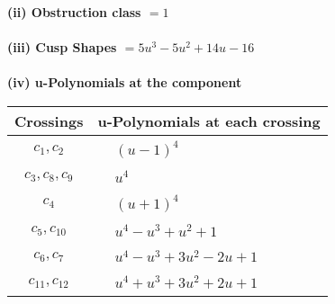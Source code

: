 \documentclass[1p]{elsarticle_modified}
\theoremstyle{definition}
\begin{document}
\flushleft \textbf{(ii) Obstruction class $= 1$}\\~\\
\flushleft \textbf{(iii) Cusp Shapes $= 5 u^3-5 u^2+14 u-16$}\\~\\
\newpage\renewcommand{\arraystretch}{1}
\flushleft \textbf{(iv) u-Polynomials at the component}\newline \\
\begin{tabular}{m{50pt}|m{274pt}}
Crossings & \hspace{64pt}u-Polynomials at each crossing \\
\hline $$\begin{aligned}c_{1},c_{2}\end{aligned}$$&$\begin{aligned}
&(u-1)^4
\end{aligned}$\\
\hline $$\begin{aligned}c_{3},c_{8},c_{9}\end{aligned}$$&$\begin{aligned}
&u^4
\end{aligned}$\\
\hline $$\begin{aligned}c_{4}\end{aligned}$$&$\begin{aligned}
&(u+1)^4
\end{aligned}$\\
\hline $$\begin{aligned}c_{5},c_{10}\end{aligned}$$&$\begin{aligned}
&u^4- u^3+u^2+1
\end{aligned}$\\
\hline $$\begin{aligned}c_{6},c_{7}\end{aligned}$$&$\begin{aligned}
&u^4- u^3+3 u^2-2 u+1
\end{aligned}$\\
\hline $$\begin{aligned}c_{11},c_{12}\end{aligned}$$&$\begin{aligned}
&u^4+u^3+3 u^2+2 u+1
\end{aligned}$\\
\hline
\end{tabular}\\~\\
\end{document}
